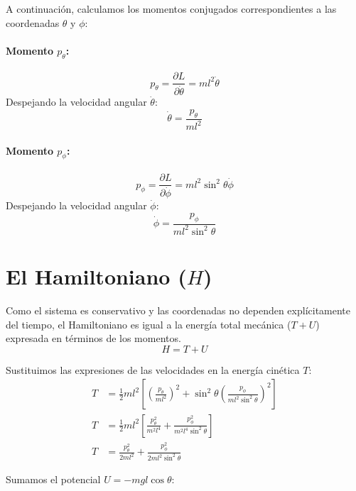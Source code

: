 \documentclass[12pt, a4paper]{article}
\begin{document}
A continuación, calculamos los momentos conjugados correspondientes a las coordenadas $\theta$ y $\phi$:

\paragraph{Momento $p_\theta$:}
\begin{equation}
    p_\theta = \frac{\partial L}{\partial \dot{\theta}} = m l^2 \dot{\theta}
\end{equation}
Despejando la velocidad angular $\dot{\theta}$:
\begin{equation}
    \dot{\theta} = \frac{p_\theta}{m l^2}
\end{equation}

\paragraph{Momento $p_\phi$:}
\begin{equation}
    p_\phi = \frac{\partial L}{\partial \dot{\phi}} = m l^2 \sin^2\theta \dot{\phi}
\end{equation}
Despejando la velocidad angular $\dot{\phi}$:
\begin{equation}
    \dot{\phi} = \frac{p_\phi}{m l^2 \sin^2\theta}
\end{equation}

\section*{El Hamiltoniano ($H$)}

Como el sistema es conservativo y las coordenadas no dependen explícitamente del tiempo, el Hamiltoniano es igual a la energía total mecánica ($T+U$) expresada en términos de los momentos.
\[ H = T + U \]

Sustituimos las expresiones de las velocidades en la energía cinética $T$:
\begin{align}
    T &= \frac{1}{2} m l^2 \left[ \left(\frac{p_\theta}{m l^2}\right)^2 + \sin^2\theta \left(\frac{p_\phi}{m l^2 \sin^2\theta}\right)^2 \right] \nonumber \\
    T &= \frac{1}{2} m l^2 \left[ \frac{p_\theta^2}{m^2 l^4} + \frac{p_\phi^2}{m^2 l^4 \sin^2\theta} \right] \nonumber \\
    T &= \frac{p_\theta^2}{2 m l^2} + \frac{p_\phi^2}{2 m l^2 \sin^2\theta}
\end{align}

Sumamos el potencial $U = -mgl \cos\theta$:
\end{document}
